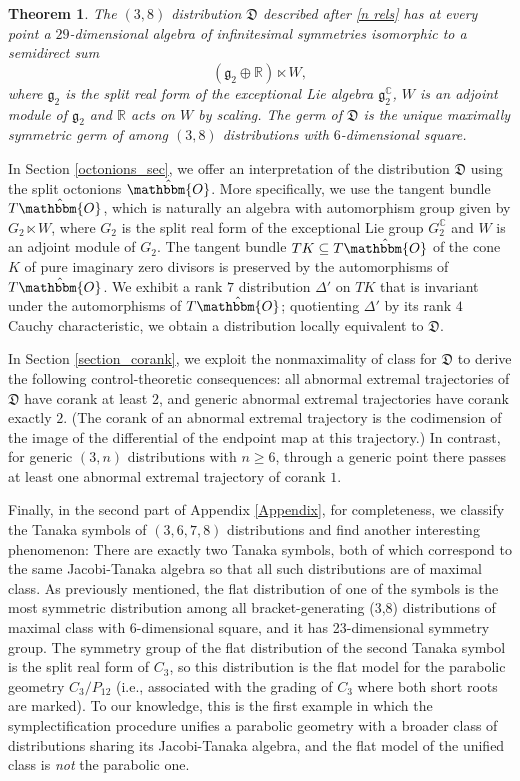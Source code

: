 \documentclass[11pt,letterpaper]{amsart}
\newtheorem{theorem}{Theorem}[section]
\numberwithin{equation}{section}
\newcommand{\oct}{\hat{\mathbbm{O}}}
\begin{document}
\begin{theorem}
    \label{Thm: main theorem}
    The $(3,8)$ distribution $\mathfrak D$ described after \eqref{n rels} has at every point a $29$-dimensional algebra of infinitesimal symmetries isomorphic to a semidirect sum
\[
    (\mathfrak{g}_2\oplus\mathbb{R})\ltimes W,
\]
where $\mathfrak{g}_2$ is the split real form of the exceptional Lie algebra $\mathfrak g_2^\mathbb C$, $W$ is an adjoint module of $\mathfrak{g}_2$ and $\mathbb R$ acts on $W$ by scaling. The germ of $\mathfrak D$ is the unique maximally symmetric germ of among $(3,8)$ distributions with $6$-dimensional square.
\end{theorem}


In Section \ref{octonions_sec}, we offer an interpretation of the distribution $\mathfrak D$ using the split octonions $\oct$. More specifically, we use the tangent bundle $T\oct$, which is naturally an algebra with automorphism group given by $ G_2\ltimes W$, where $G_2$ is the split real form of the exceptional Lie group $G_2^\mathbb C$ and $W$ is an adjoint module of $G_2$. The tangent bundle $TK\subseteq T\oct$ of the cone $K$ of pure imaginary zero divisors is preserved by the automorphisms of $T\oct$. We exhibit a rank $7$ distribution $\Delta'$ on $TK$ that is invariant under the automorphisms of $T\oct$; quotienting $\Delta'$ by its rank $4$ Cauchy characteristic, we obtain a distribution locally equivalent to $\mathfrak D$.

In Section \ref{section_corank}, we exploit the nonmaximality of class for $\mathfrak D$ to derive the following control-theoretic consequences: all abnormal extremal trajectories of $\mathfrak{D}$ have corank at least $2$, and generic abnormal extremal trajectories have corank exactly $2$. (The corank of an abnormal extremal trajectory is the codimension of the image of the differential of the endpoint map at this trajectory.) In contrast, for generic $(3,n)$ distributions with $n \geq 6$, through a generic point there passes at least one abnormal extremal trajectory of corank $1$.

Finally, in the second part of Appendix \ref{Appendix}, for completeness, we classify the Tanaka symbols of $(3,6,7,8)$ distributions and find another interesting phenomenon: There are exactly two Tanaka symbols, both of which correspond to the same Jacobi-Tanaka algebra so that all such distributions are of maximal class. As previously mentioned, the flat distribution of one of the symbols is the most symmetric distribution among all bracket-generating (3,8) distributions of maximal class with $6$-dimensional square, and it has 23-dimensional symmetry group.
The symmetry group of the flat distribution of the second Tanaka symbol is the split real form of $C_3$, so this distribution is the flat model for the parabolic geometry $C_3/P_{12}$ (i.e., associated with the grading of $C_3$ where both short roots are marked). To our knowledge, this is the first example in which the symplectification procedure unifies a parabolic geometry with a broader class of distributions sharing its Jacobi-Tanaka algebra, and the flat model of the unified class is \textit{not} the parabolic one.
\end{document}
